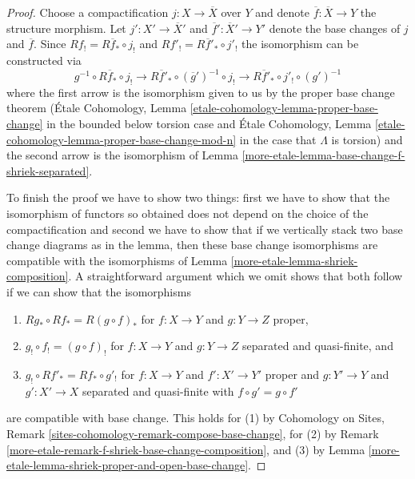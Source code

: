 \begin{proof}
Choose a compactification $j : X \to \overline{X}$ over $Y$
and denote $\overline{f} : \overline{X} \to Y$ the structure morphism.
Let $j' : X' \to \overline{X}'$ and $\overline{f}' : \overline{X}' \to Y'$
denote the base changes of $j$ and $\overline{f}$.
Since $Rf_! = R\overline{f}_* \circ j_!$ and $Rf'_! =
R\overline{f}'_* \circ j'_!$ the isomorphism can be constructed via
$$
g^{-1} \circ R\overline{f}_* \circ j_! \to
R\overline{f}'_* \circ (\overline{g}')^{-1} \circ j_! \to
R\overline{f}'_* \circ j'_! \circ (g')^{-1}
$$
where the first arrow is the isomorphism given to us by the
proper base change theorem (\'Etale Cohomology, Lemma
\ref{etale-cohomology-lemma-proper-base-change} in the bounded below torsion
case and \'Etale Cohomology, Lemma
\ref{etale-cohomology-lemma-proper-base-change-mod-n} in the
case that $\Lambda$ is torsion) and the second arrow is the isomorphism of
Lemma \ref{more-etale-lemma-base-change-f-shriek-separated}.

\medskip\noindent
To finish the proof we have to show two things: first we have to show
that the isomorphism of functors so obtained does not depend on
the choice of the compactification and second we have to show that
if we vertically stack two base change diagrams as in the lemma, then
these base change isomorphisms are compatible with the isomorphisms
of Lemma \ref{more-etale-lemma-shriek-composition}.
A straightforward argument which we omit shows that both follow
if we can show that the isomorphisms
\begin{enumerate}
\item $Rg_* \circ Rf_* = R(g \circ f)_*$ for $f : X \to Y$ and $g : Y \to Z$
proper,
\item $g_! \circ f_! = (g \circ f)_!$ for $f : X \to Y$ and $g : Y \to Z$
separated and quasi-finite, and
\item $g_! \circ Rf'_* = Rf_* \circ g'_!$ for  $f : X \to Y$ and
$f' : X' \to Y'$ proper and $g : Y' \to Y$ and $g' : X' \to X$
separated and quasi-finite with $f \circ g' = g \circ f'$
\end{enumerate}
are compatible with base change. This holds for (1) by
Cohomology on Sites, Remark \ref{sites-cohomology-remark-compose-base-change},
for (2) by Remark \ref{more-etale-remark-f-shriek-base-change-composition}, and
(3) by Lemma \ref{more-etale-lemma-shriek-proper-and-open-base-change}.
\end{proof}

